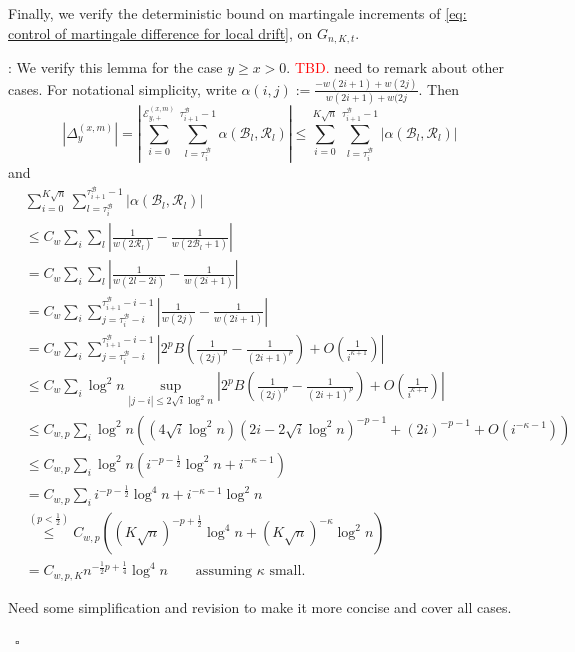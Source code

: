 \documentclass[twoside,12pt,a4paper]{article}
\numberwithin{equation}{section}
\newenvironment{proof}[1][Proof]{{\sc #1}:}{~\hfill $\square$}
\newcommand\TBD{\textcolor{red}{TBD.}}
\begin{document}
\vspace{2em}

Finally, we verify the deterministic bound on martingale increments of \eqref{eq: control of martingale difference for local drift}, on $G_{n, K, t}$.

\begin{proof}[Proof of Lemma~\ref{lm:lipchitz-bound-on-good-event}]
	We verify this lemma for the case $y \ge  x > 0$. \TBD {\color{red} need to remark about other cases}.
	For notational simplicity, write $\alpha(i,j) := \frac{-w(2 i + 1) + w(2 j)}{w(2i + 1) + w(2 j}$. Then
\begin{equation*}
	\left| \Delta_y^{(x,m)} \right| 
	= 
	\left| 	\sum_{i = 0}^{\mathcal{E}_{y,+}^{(x,m)}} 
	\sum_{l = \tau_i^{\mathcal{B}}} ^{\tau_{i+1}^{\mathcal{B}}  -1}
	\alpha(\mathcal{B}_l, \mathcal{R}_l)
	\right| 
	\le 
	\sum_{i = 0}^{K \sqrt{n} } 
	\sum_{l = \tau_i^{\mathcal{B}}} ^{\tau_{i+1}^{\mathcal{B}}  -1}
	\left|
	\alpha(\mathcal{B}_l, \mathcal{R}_l)
	\right| 
\end{equation*}
and
\begin{align*}
	&\sum_{i = 0}^{K \sqrt{n} } 
	\sum_{l = \tau_i^{\mathcal{B}}} ^{\tau_{i+1}^{\mathcal{B}}  -1}
	|\alpha(\mathcal{B}_l, \mathcal{R}_l)|\\
	&\le C_w \sum_i \sum_l \left| \frac{1}{w(2 \mathcal{R}_l)} - \frac{1}{w(2 \mathcal{B}_l + 1)} \right|  \\
	&= C_w \sum_i \sum_l \left| \frac{1}{w(2 l - 2 i)} - \frac{1}{w(2i + 1)} \right|  \\
	&= C_w \sum_i \sum_{j = \tau_i^{\mathcal{B}} - i}^{\tau_{i+1}^{\mathcal{B}} - i - 1} \left| \frac{1}{w(2j)} - \frac{1}{w(2i + 1)} \right|  \\
	&= C_w \sum_i \sum_{j = \tau_i^{\mathcal{B}} - i}^{\tau_{i+1}^{\mathcal{B}} - i - 1} \left|  2^p B\left( \frac{1}{(2j)^p} - \frac{1}{(2i + 1)^p} \right)  + O\left( \frac{1}{i^{\kappa + 1}} \right) \right|  \\
	&\le C_w \sum_i \log^2 n \sup_{|j - i| \le 2 \sqrt{i}  \log^2 n} \left|  2^p B\left( \frac{1}{(2j)^p} - \frac{1}{(2i + 1)^p} \right)  + O\left( \frac{1}{i^{\kappa + 1}} \right) \right| \\
	&\le C_{w, p} \sum_i \log^2 n \left( 
		(4 \sqrt{ i } \log^2 n) (2 i - 2 \sqrt{ i } \log^2 n)^{- p - 1} + (2 i)^{- p - 1} + O(i^{- \kappa - 1})
	\right)  \\
	&\le C_{w, p} \sum_i \log^2 n \left( i ^{-p - \frac{1}{2}} \log^2 n +  i^{- \kappa - 1} \right)  \\
	&= C_{w, p} \sum_i i^{- p - \frac{1}{2}} \log^4 n + i^{- \kappa - 1 } \log^2 n \\
	&\stackrel{(p<\frac{1}{2})}{\le } C_{w, p} \left( (K \sqrt{ n} )^{-p+ \frac{1}{2}} \log^4 n + (K \sqrt{ n} )^{- \kappa } \log^2 n \right)  \\
	&= C_{w, p, K} n^{-\frac{1}{2}p + \frac{1}{4}  }  \log^4 n \qquad \text{assuming $\kappa$ small}
.\end{align*} 

{\color{red} Need some simplification and revision to make it more concise and cover all cases.}

\end{proof}
\end{document}
